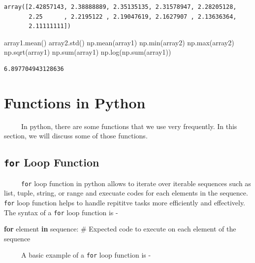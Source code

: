 \documentclass[
  letterpaper,
  DIV=11,
  numbers=noendperiod]{scrreprt}
\newenvironment{Shaded}{\begin{snugshade}}{\end{snugshade}}
\newcommand{\BuiltInTok}[1]{\textcolor[rgb]{0.00,0.23,0.31}{#1}}
\newcommand{\CommentTok}[1]{\textcolor[rgb]{0.37,0.37,0.37}{#1}}
\newcommand{\ControlFlowTok}[1]{\textcolor[rgb]{0.00,0.23,0.31}{\textbf{#1}}}
\newcommand{\KeywordTok}[1]{\textcolor[rgb]{0.00,0.23,0.31}{\textbf{#1}}}
\newcommand{\NormalTok}[1]{\textcolor[rgb]{0.00,0.23,0.31}{#1}}
\begin{document}
\begin{verbatim}
array([2.42857143, 2.38888889, 2.35135135, 2.31578947, 2.28205128,
       2.25      , 2.2195122 , 2.19047619, 2.1627907 , 2.13636364,
       2.11111111])
\end{verbatim}

\begin{Shaded}
\begin{Highlighting}[]
\NormalTok{array1.mean()}
\NormalTok{array2.std()}
\NormalTok{np.mean(array1)}
\NormalTok{np.}\BuiltInTok{min}\NormalTok{(array2)}
\NormalTok{np.}\BuiltInTok{max}\NormalTok{(array2)}
\NormalTok{np.sqrt(array1)}
\NormalTok{np.}\BuiltInTok{sum}\NormalTok{(array1)}
\NormalTok{np.log(np.}\BuiltInTok{sum}\NormalTok{(array1))}
\end{Highlighting}
\end{Shaded}

\begin{verbatim}
6.897704943128636
\end{verbatim}

\section{Functions in Python}\label{functions-in-python}

~~~~~In python, there are some functions that we use very frequently. In
this section, we will discuss some of those functions.

\subsection{\texorpdfstring{\texttt{for} Loop
Function}{for Loop Function}}\label{for-loop-function}

~~~~~\texttt{for} loop function in python allows to iterate over
iterable sequences such as list, tuple, string, or range and execuate
codes for each elements in the sequence. \texttt{for} loop function
helps to handle repititve tasks more efficiently and effectively. The
syntax of a \texttt{for} loop function is -

\begin{Shaded}
\begin{Highlighting}[]
\ControlFlowTok{for}\NormalTok{ element }\KeywordTok{in}\NormalTok{ sequence:}
  \CommentTok{\# Expected code to execute on each element of the sequence}
\end{Highlighting}
\end{Shaded}

~~~~~A basic example of a \texttt{for} loop function is -
\end{document}
